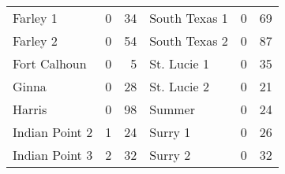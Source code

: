 \documentclass {book}
\begin{document}
\begin{enumerate}[\ref{ch10}.1]
\begin{table}
\begin{tabular}{lcr |lcr}
Farley 1         & {\hspace{0.1in}}0\mbox{\hspace{0.1in}} & 34\phantom{*}   &{\hspace{0.1in}}South Texas 1    & {\hspace{0.1in}}0\mbox{\hspace{0.1in}} & 69\\
Farley 2         & {\hspace{0.1in}}0\mbox{\hspace{0.1in}} & 54\phantom{*}   &{\hspace{0.1in}}South Texas 2    & {\hspace{0.1in}}0\mbox{\hspace{0.1in}} & 87\\
Fort Calhoun     & {\hspace{0.1in}}0\mbox{\hspace{0.1in}} & 5\phantom{*}    &{\hspace{0.1in}}St. Lucie 1      & {\hspace{0.1in}}0\mbox{\hspace{0.1in}} & 35\\
Ginna            & {\hspace{0.1in}}0\mbox{\hspace{0.1in}} & 28\phantom{*}   &{\hspace{0.1in}}St. Lucie 2      & {\hspace{0.1in}}0\mbox{\hspace{0.1in}} & 21\\
Harris           & {\hspace{0.1in}}0\mbox{\hspace{0.1in}} & 98\phantom{*}   &{\hspace{0.1in}}Summer           & {\hspace{0.1in}}0\mbox{\hspace{0.1in}} & 24 \\
Indian Point 2   & {\hspace{0.1in}}1\mbox{\hspace{0.1in}} & 24\phantom{*}   &{\hspace{0.1in}}Surry 1          & {\hspace{0.1in}}0\mbox{\hspace{0.1in}} & 26\\
Indian Point 3   & {\hspace{0.1in}}2\mbox{\hspace{0.1in}} & 32\phantom{*}   &{\hspace{0.1in}}Surry 2          & {\hspace{0.1in}}0\mbox{\hspace{0.1in}} & 32\\

\end{tabular}
\end{table}
\end{enumerate}
\end{document}
